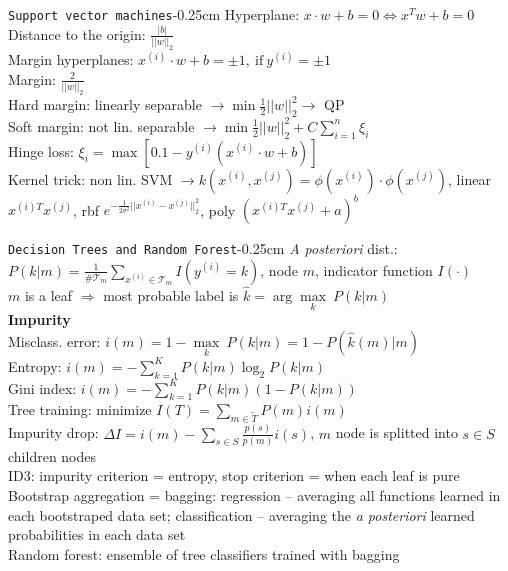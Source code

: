 \documentclass[10pt,3col]{cheatsheet}
\begin{document}
\begin{multicols}{3}
\begin{cheatsheetbox}{\texttt{Support vector machines}}{-0.25cm}
    Hyperplane: $x \cdot w + b = 0 \Leftrightarrow x^Tw + b = 0$\\
    Distance to the origin: $\frac{|b|}{||w||_2}$\\
    Margin hyperplanes: $x^{(i)} \cdot w + b = \pm 1 , \ \mathrm{if} \ y^{(i)} = \pm 1$\\
    Margin: $\frac{2}{||w||_2}$\\
    Hard margin: linearly separable $\rightarrow \min \frac{1}{2}||w||^2_2 \rightarrow$ QP\\
    Soft margin: not lin. separable $\rightarrow \min \frac{1}{2}||w||^2_2 + C \sum_{i = 1}^n \xi_i$\\
    Hinge loss: $\xi_i = \max\left[0.1 - y^{(i)}(x^{(i)}\cdot w +b)\right]$\\
    Kernel trick: non lin. SVM $\rightarrow k(x^{(i)}, x^{(j)}) = \phi(x^{(i)}) \cdot \phi(x^{(j)})$, linear $x^{(i)T}x^{(j)}$, rbf $e^{-\frac{1}{2\sigma^2}||x^{(i)}-x^{(j)}||_2^2}$, poly $(x^{(i)T}x^{(j)}+a)^b$
\end{cheatsheetbox}

\begin{cheatsheetbox}{\texttt{Decision Trees and Random Forest}}{-0.25cm}
    \emph{A posteriori} dist.: $P(k|m) = \frac{1}{\#\mathcal{T}_m} \sum_{x^{(i)} \in \mathcal{T}_m} I(y^{(i)} = k)$, node $m$, indicator function $I(\cdot)$\\
    $m$ is a leaf $\Rightarrow$ most probable label is $\hat{k} = \arg\underset{k}{\max} \ P(k|m)$\\
    \textbf{Impurity}\\
    Misclass. error: $i(m) = 1 - \underset{k}{\max} \ P(k|m) = 1 - P(\hat{k}(m)|m)$\\
    Entropy: $i(m) = -\sum_{k=1}^K P(k|m)\log_2 P(k|m)$\\
    Gini index: $i(m) = -\sum_{k=1}^K P(k|m)(1 - P(k|m))$\\
    Tree training: minimize $I(T) = \sum_{m \in \tilde{T}}P(m)i(m)$\\
    Impurity drop: $\Delta I = i(m) - \sum_{s \in S}\frac{p(s)}{p(m)}i(s)$, $m$ node is splitted into $s \in S$ children nodes\\
    ID3: impurity criterion = entropy, stop criterion = when each leaf is pure\\
    Bootstrap aggregation = bagging: regression -- averaging all functions learned in each bootstraped data set; classification -- averaging the \emph{a posteriori} learned probabilities in each data set\\
    Random forest: ensemble of tree classifiers trained with bagging
\end{cheatsheetbox}

\makefooter

\end{multicols}
\end{document}
